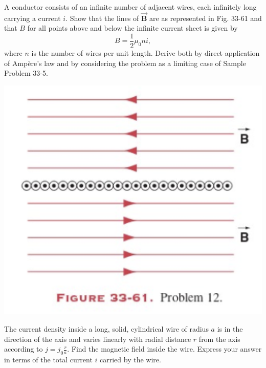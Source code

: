 \documentclass[12pt,letterpaper]{hmcpset}
\begin{document}
	\begin{problem}[33P12:]
		A conductor consists of an infinite number of adjacent wires, each infinitely long carrying a current $i$.
		Show that the lines of $\vec{\mathbf{B}}$ are as represented in Fig. 33-61 and that $B$ for all points above and below the infinite current sheet is given by
		\[B = \frac{1}{2}\mu_0ni,\]
		where $n$ is the number of wires per unit length.
		Derive both by direct application of Ampère's law and by considering the problem as a limiting case of Sample Problem 33-5.

		\centering\includegraphics[scale = 0.4]{Fig_33-61}
	\end{problem}
	\clearpage



	\begin{problem}[33P13:]
		The current density inside a long, solid, cylindrical wire of radius $a$ is in the direction of the axis and varies linearly with radial distance $r$ from the axis according to $j = j_0\frac{r}{a}$.
		Find the magnetic field inside the wire.
		Express your answer in terms of the total current $i$ carried by the wire.
	\end{problem}
	\clearpage
\end{document}
